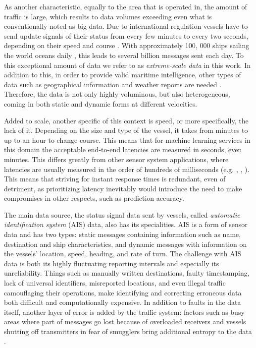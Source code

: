 As another characteristic, equally to the area that is operated in, the amount of traffic is large, which results to data volumes exceeding even what is conventionally noted as big data. Due to international regulation vessels have to send update signals of their status from every few minutes to every two seconds, depending on their speed and course \cite{maritimeinformatics}. With approximately 100, 000 ships sailing the world oceans daily \cite{maritimeinformatics}, this leads to several billion messages sent each day. To this exceptional amount of data we refer to as \textit{extreme-scale data} in this work. In addition to this, in order to provide valid maritime intelligence, other types of data such as geographical information and weather reports are needed \cite{D1.1}. Therefore, the data is not only highly voluminous, but also heterogeneous, coming in both static and dynamic forms at different velocities.

Added to scale, another specific of this context is speed, or more specifically, the lack of it. Depending on the size and type of the vessel, it takes from minutes to up to an hour to change course. This means that for machine learning services in this domain the acceptable end-to-end latencies are measured in seconds, even minutes. This differs greatly from other sensor system applications, where latencies are usually measured in the order of hundreds of milliseconds (e.g. \cite{anomalysystem}, \cite{facebook}, \cite{edgelatency}). This means that striving for instant response times is redundant, even of detriment, as prioritizing latency inevitably would introduce the need to make compromises in other respects, such as prediction accuracy.

The main data source, the status signal data sent by vessels, called \textit{automatic identification system} (AIS) data, also has its specialities. AIS is a form of sensor data and has two types: static messages containing information such as name, destination and ship characteristics, and dynamic messages with information on the vessels' location, speed, heading, and rate of turn. The challenge with AIS data is both its highly fluctuating reporting intervals and especially its unreliability.  Things such as manually written destinations, faulty timestamping, lack of universal identifiers, misreported locations, and even illegal traffic camouflaging their operations, make identifying and correcting erroneous data both difficult and computationally expensive. In addition to faults in the data itself, another layer of error is added by the traffic system: factors such as busy areas where part of messages go lost because of overloaded receivers and vessels shutting off transmitters in fear of smugglers bring additional entropy to the data \cite{maritimeinformatics}.

